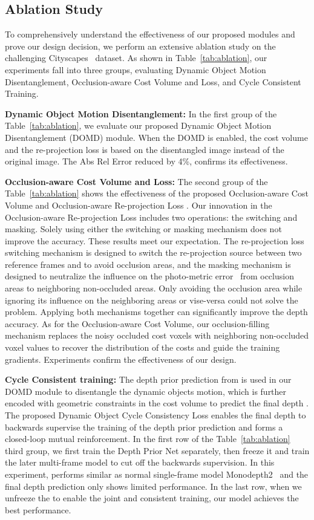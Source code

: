 \documentclass[runningheads]{llncs}
\begin{document}
\subsection{Ablation Study}
\label{sec:ablation}

To comprehensively understand the effectiveness of our proposed modules and prove our design decision, we perform an extensive ablation study on the challenging Cityscapes~\cite{Cityscapes} dataset. As shown in Table~\ref{tab:ablation}, our experiments fall into three groups, evaluating Dynamic Object Motion Disentanglement, Occlusion-aware Cost Volume and Loss, and Cycle Consistent Training.

\textbf{Dynamic Object Motion Disentanglement:}
In the first group of the Table~\ref{tab:ablation}, we evaluate our proposed Dynamic Object Motion Disentanglement (DOMD) module. When the DOMD is enabled, the cost volume and the re-projection loss is based on the disentangled  image instead of the original  image. The Abs Rel Error reduced by 4\%, confirms its effectiveness.

\textbf{Occlusion-aware Cost Volume and Loss:}
The second group of the Table~\ref{tab:ablation} shows the effectiveness of the proposed Occlusion-aware Cost Volume  and Occlusion-aware Re-projection Loss . Our innovation in the Occlusion-aware Re-projection Loss includes two operations: the switching and masking. Solely using either the switching or masking mechanism does not improve the accuracy. These results meet our expectation. The re-projection loss switching mechanism is designed to switch the re-projection source between two reference frames  and  to avoid occlusion areas, and the masking mechanism is designed to neutralize the influence on the photo-metric error~\cite{ssim} from occlusion areas to neighboring non-occluded areas. Only avoiding the occlusion area while ignoring its influence on the neighboring areas or vise-versa could not solve the problem. Applying both mechanisms together can significantly improve the depth accuracy. As for the Occlusion-aware Cost Volume, our occlusion-filling mechanism replaces the noisy occluded cost voxels with neighboring non-occluded voxel values to recover the distribution of the costs and guide the training gradients. Experiments confirm the effectiveness of our design.

\textbf{Cycle Consistent training:}
The depth prior prediction  from  is used in our DOMD module to disentangle the dynamic objects motion, which is further encoded with geometric constraints in the cost volume to predict the final depth . The proposed Dynamic Object Cycle Consistency Loss  enables the final depth  to backwards supervise the training of the depth prior prediction  and forms a closed-loop mutual reinforcement. 
In the first row of the Table~\ref{tab:ablation} third group, we first train the Depth Prior Net  separately, then freeze it and train the later multi-frame model to cut off the backwards supervision. In this experiment,  performs similar as normal single-frame model Monodepth2~\cite{monodepth2} and the final depth prediction only shows limited performance. In the last row, when we unfreeze the  to enable the joint and consistent training, our model achieves the best performance.
\end{document}
